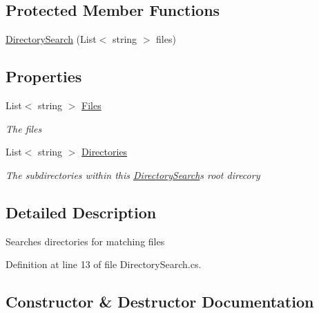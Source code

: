 \subsection*{Protected Member Functions}
\begin{DoxyCompactItemize}
\item 
\hyperlink{classHumDrum_1_1Operations_1_1Files_1_1DirectorySearch_ad00c0c8f19b6a6e26aa50c4521a5dba4}{Directory\+Search} (List$<$ string $>$ files)
\end{DoxyCompactItemize}
\subsection*{Properties}
\begin{DoxyCompactItemize}
\item 
List$<$ string $>$ \hyperlink{classHumDrum_1_1Operations_1_1Files_1_1DirectorySearch_ae7bda27ea2f731ad9bbc04ae27d48fa9}{Files}
\begin{DoxyCompactList}\small\item\em The files \end{DoxyCompactList}\item 
List$<$ string $>$ \hyperlink{classHumDrum_1_1Operations_1_1Files_1_1DirectorySearch_a6795fc572ba723e404c68ebec38508f6}{Directories}
\begin{DoxyCompactList}\small\item\em The subdirectories within this \hyperlink{classHumDrum_1_1Operations_1_1Files_1_1DirectorySearch}{Directory\+Search}\textquotesingle{}s root direcory \end{DoxyCompactList}\end{DoxyCompactItemize}


\subsection{Detailed Description}
Searches directories for matching files 



Definition at line 13 of file Directory\+Search.\+cs.



\subsection{Constructor \& Destructor Documentation}
